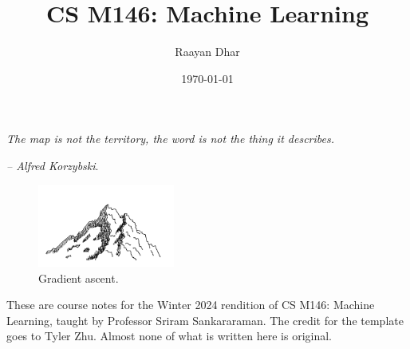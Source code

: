 \documentclass[11 pt]{scrartcl}
\begin{document}
 
\title{\Large CS M146: Machine Learning}
\author{\large Raayan Dhar}
\date{\large\today}

\maketitle 

\begin{center}
\begin{displayquote}
    \emph{The map is not the territory, the word is not the thing it describes.} \\ \begin{flushright} \emph{– Alfred Korzybski}.  \end{flushright}
\end{displayquote}
\end{center}
\begin{figure}[h!]
    \centering
    \includegraphics[width=0.4\textwidth]{images/mtn.png}
    \caption*{Gradient ascent.}
\end{figure}

These are course notes for the Winter 2024 rendition of CS M146: Machine Learning, taught by Professor Sriram Sankararaman. The credit for the template goes to Tyler Zhu. Almost none of what is written here is original.

\tableofcontents 

\newpage

\end{document}
